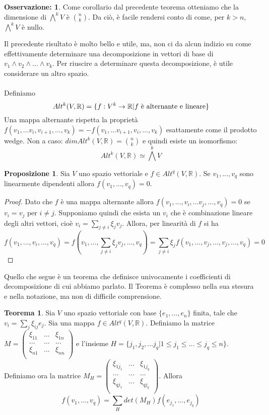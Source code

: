\documentclass[12pt,a4paper]{report}
\theoremstyle{definition}
\theoremstyle{Theorem}
\newtheorem{Theo}[Def]{Teorema}
\newtheorem{Prop}[Def]{Proposizione}
\theoremstyle{definition}
\theoremstyle{definition}
\theoremstyle{definition}
\newtheorem{Obs}[Def]{Osservazione:}
\begin{document}
	\begin{Obs}
		Come corollario dal precedente teorema otteniamo che la dimensione di $\bigwedge^k V$ è ${n\choose k}$. Da ciò, è facile rendersi conto di come, per $k> n$, $\bigwedge^k V$ è nullo.	
		\end{Obs}
	Il precedente risultato è molto bello e utile, ma, non ci da alcun indizio su come effettivamente determinare una decomposizione in vettori di base di $v_1\wedge v_2\wedge...\wedge v_k$. Per riuscire a determinare questa decomposizione, è utile considerare un altro spazio.\\
	\\
	Definiamo 
	$$Alt^k(V,\mathbb{R})=\{f:V^k\rightarrow \mathbb{R}| f \hbox{ è alternante e lineare}\}$$
	Una mappa alternante rispetta la proprietà $f(v_1,...v_i,v_{i+1},...,v_k)=-f(v_1,...v_{i+1},v_{i},...,v_k)$ esattamente come il prodotto wedge. Non a caso: $dim Alt^k(V,\mathbb{R})={n\choose k}$ e quindi esiste un isomorfismo:
	$$Alt^k(V,\mathbb{R})\simeq \bigwedge^k V$$
	\begin{Prop}
		Sia $V$ uno spazio vettoriale e $f\in Alt^q(V,\mathbb{R})$. Se $v_1,...,v_q$ sono linearmente dipendenti allora $f(v_1,...,v_q)=0.$
	\end{Prop}
	\begin{proof}
		Dato che $f$ è una mappa alternante allora $f(v_1,...,v_i,...v_j,...,v_q)=0$ se $v_i=v_j$ per $i\neq j$. Supponiamo quindi che esista un $v_i$ che è combinazione lineare degli altri vettori, cioè $v_i=\sum_{j\neq i}\xi_jv_j$. Allora, per linearità di $f$ si ha
		$$f(v_1,...,v_i,...,v_q)=f(v_1,...,\sum_{j\neq i}\xi_jv_j,...,v_q)=\sum_{j\neq i}\xi_jf(v_1,...,v_j,...,v_j,...,v_q)=0$$
	\end{proof}
	Quello che segue è un teorema che definisce univocamente i coefficienti di decomposizione di cui abbiamo parlato. Il Teorema è complesso nella sua stesura e nella notazione, ma non di difficile comprensione.
	\begin{Theo}\label{Theo 2}
		Sia $V$ uno spazio vettoriale con base $\{e_1,...,e_n\}$ finita, tale che $v_i=\sum_{j}\xi_{ij}e_j$. Sia una mappa $f\in Alt^q(V,\mathbb{R})$. Definiamo la matrice 
		$M=\begin{pmatrix}
			\xi_{11} &...& \xi_{1n}\\
			... &...& ...\\
			\xi_{n1} &...& \xi_{nn}\\
		\end{pmatrix}$ e l'insieme $H=\{j_1,j_2,...j_q|1\leq j_1\le...\le j_q\leq n\}$. Definiamo ora la matrice 
		$M_H=\begin{pmatrix}
			\xi_{1j_1} &...& \xi_{1j_q}\\
			... &...& ...\\
			\xi_{qj_1} &...& \xi_{qj_q}\\
		\end{pmatrix}$. Allora 
		$$f(v_1,...,v_q)=\sum_{H}det(M_H)f(e_{j_1},...,e_{j_q})$$
	\end{Theo}
\end{document}
